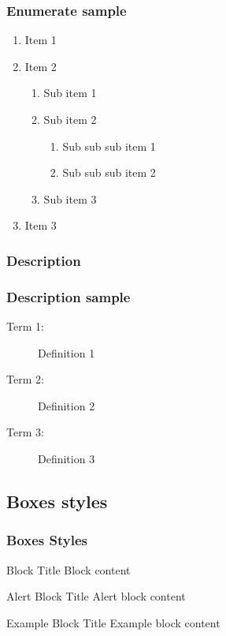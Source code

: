 \begin{frame}[label=enumerate]\frametitle{Enumerate sample} 
	\begin{enumerate}
		\item Item 1
		\item Item 2
		\begin{enumerate}
			\item Sub item 1
			\item Sub item 2
			\begin{enumerate}
				\item Sub sub sub item 1
				\item Sub sub sub item 2
			\end{enumerate}
			\item Sub item 3
		\end{enumerate}
		\item Item 3
	\end{enumerate}
\end{frame}

\subsubsection{Description}

\begin{frame}[label=description]\frametitle{Description sample}
    
\begin{description}
	\item[Term 1:] Definition 1
	\item[Term 2:] Definition 2
	\item[Term 3:] Definition 3
\end{description}

\end{frame}

\subsection{Boxes styles}

\begin{frame}[label=boxes]\frametitle{Boxes Styles}
    
\begin{block}{Block Title}
	Block content
\end{block}

\begin{alertblock}{Alert Block Title}
	Alert block content
\end{alertblock}

\begin{exampleblock}{Example Block Title}
	Example block content
\end{exampleblock}

\end{frame}

